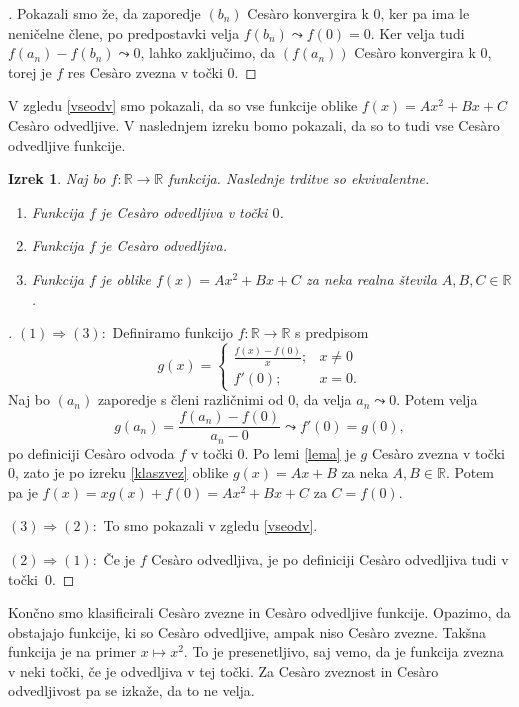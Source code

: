 \documentclass[a4paper,12pt]{article}
\theoremstyle{definition}
\theoremstyle{plain}
\newtheorem{izrek}{Izrek}
\newenvironment{dokaz}{\begin{proof}[\bfseries\upshape\proofname]}{\end{proof}}
\begin{document}
\begin{dokaz}
    Pokazali smo že, da zaporedje $(b_n)$ Ces\`{a}ro konvergira k $0$, ker pa ima le neničelne člene, po predpostavki velja $f(b_n) \leadsto f(0) = 0$. Ker velja tudi $f(a_n) - f(b_n) \leadsto 0$, lahko zaključimo, da $(f(a_n))$ Ces\`{a}ro konvergira k $0$, torej je $f$ res Ces\`{a}ro zvezna v točki $0$.
\end{dokaz}

V zgledu \ref{vseodv} smo pokazali, da so vse funkcije oblike $f(x) = Ax^2 + Bx + C$ Ces\`{a}ro odvedljive. V naslednjem izreku bomo pokazali, da so to tudi vse Ces\`{a}ro odvedljive funkcije.

\begin{izrek}
    \label{klasodv}
    Naj bo $f: \mathbb{R} \rightarrow \mathbb{R}$ funkcija. Naslednje trditve so ekvivalentne.
    \begin{enumerate}
        \item Funkcija $f$ je Ces\`{a}ro odvedljiva v točki $0$.
        \item Funkcija $f$ je Ces\`{a}ro odvedljiva.
        \item Funkcija $f$ je oblike $f(x) = Ax^2 + Bx + C$ za neka realna števila $A, B, C \in \mathbb{R}$.
    \end{enumerate}
\end{izrek}
\begin{dokaz}
    $(1) \Rightarrow (3): $ Definiramo funkcijo $f: \mathbb{R} \rightarrow \mathbb{R}$ s predpisom 
    $$
    g(x) = \begin{cases}
        \frac{f(x)-f(0)}{x}; & x \neq 0\\
        f'(0); & x = 0.
    \end{cases}
    $$
    Naj bo $(a_n)$ zaporedje s členi različnimi od $0$, da velja $a_n \leadsto 0$. Potem velja 
    $$g(a_n) = \frac{f(a_n)-f(0)}{a_n-0} \leadsto f'(0) = g(0),$$
    po definiciji Ces\`{a}ro odvoda $f$ v točki $0$. Po lemi \ref{lema} je $g$ Ces\`{a}ro zvezna v točki $0$, zato je po izreku \ref{klaszvez} oblike $g(x) = Ax + B$ za neka $A, B \in \mathbb{R}$. Potem pa je 
    $f(x) = xg(x) + f(0) = Ax^2 + Bx + C$ za $C = f(0)$.

    $(3) \Rightarrow (2): $ To smo pokazali v zgledu \ref{vseodv}.

    $(2) \Rightarrow (1): $ Če je $f$ Ces\`{a}ro odvedljiva, je po definiciji Ces\`{a}ro odvedljiva tudi v točki~$0$.
\end{dokaz}

Končno smo klasificirali Ces\`{a}ro zvezne in Ces\`{a}ro odvedljive funkcije. Opazimo, da obstajajo funkcije, ki so Ces\`{a}ro odvedljive, ampak niso Ces\`{a}ro zvezne. Takšna funkcija je na primer $x \mapsto x^2$. To je presenetljivo, saj vemo, da je funkcija zvezna v neki točki, če je odvedljiva v tej točki. Za Ces\`{a}ro zveznost in Ces\`{a}ro odvedljivost pa se izkaže, da to ne velja.
\end{document}
